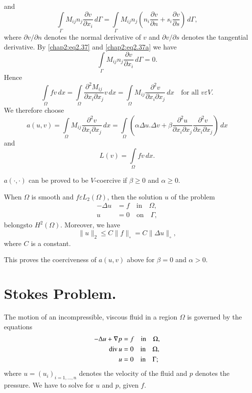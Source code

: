 \begin{itemize}
$$$$
and
$$
\int\limits_\Gamma M_{ij}n_j\frac{\partial v}{\partial x_i}\,d\Gamma=
\int\limits_\Gamma M_{ij}n_j\left(n_i\frac{\partial v}{\partial n}+s_i
\frac{\partial v}{\partial s}\right)\,d\Gamma,
$$
where $\partial v/\partial n$ denotes the normal derivative of $v$ and
$\partial v/\partial s$ denotes the tangential derivative. By
\eqref{chap2:eq2.37} and \eqref{chap2:eq2.37a} we have 
$$
\int\limits_\Gamma M_{ij}n_j\frac{\partial v}{\partial x_i}\,d\Gamma=0. 
$$
Hence
$$
\int\limits_\Omega fv\,dx=\int\limits_\Omega \frac{\partial^2M_{ij}}
{\partial x_i\partial x_j}v\,dx=\int\limits_\Omega M_{ij}
\frac{\partial^2v}{\partial x_i\partial x_j}\,dx\quad\text{for all }
 v\varepsilon V.
$$
We therefore choose
\begin{equation}\label{chap2:eq2.40}
a(u, v)=\int\limits_\Omega M_{ij}\frac{\partial^2v}{\partial x_i
\partial x_j}\,dx=\int\limits_\Omega\left(\alpha\Delta u.\Delta v+\beta
\frac{\partial^2u}{\partial x_i\partial x_j}\frac{\partial^2v}
{\partial x_i\partial x_j}\right)\,dx
\end{equation}
and
\begin{equation}\label{chap2:eq2.41}
L(v)=\int\limits_\Omega fv\,dx.
\end{equation}

$a(\cdotp,\cdotp)$ can be proved to be $V$-coercive if $\beta\geq 0$
and $\alpha\geq 0$.
\end{itemize}

\setcounter{regthm}{3}
\begin{regthm}\label{chap2:rgthm4}
When $\Omega$ is smooth and $f\varepsilon L_2(\Omega)$, then the
solution $u$ of the problem 
\begin{align*}
-\Delta u &= f\quad\text{in}\quad\Omega,\\
u &= 0\quad\text{on}\quad\Gamma,
\end{align*}
belongs\pageoriginale to $H^2(\Omega)$. Moreover, we have 
$$
\parallel u\parallel_2\leq C\parallel f\parallel_\circ =C\parallel
\Delta u\parallel_\circ,
$$
where $C$ is a constant.
\end{regthm}

This proves the coerciveness of $a(u, v)$ above for $\beta =0$ and
$\alpha >0$. 

\section{Stokes Problem.}\label{chap2:ssec2.6}
The motion of an incompressible, viscous fluid in a region $\Omega$ is
governed by the equations
\begin{align}
-\Delta u+\nabla p &= f\quad\text{in}\quad\Omega,\label{chap2:eq2.42}\\
\operatorname{div} u &= 0\quad\text{in}\quad\Omega,\label{chap2:eq2.43}\\ 
u &= 0\quad\text{in}\quad\Gamma;\label{chap2:eq2.44}
\end{align}
where $u=(u_i)_{i=1,\ldots,n}$ denotes the velocity of the fluid and
$p$ denotes the pressure. We have to solve for $u$ and $p$, given $f$.

